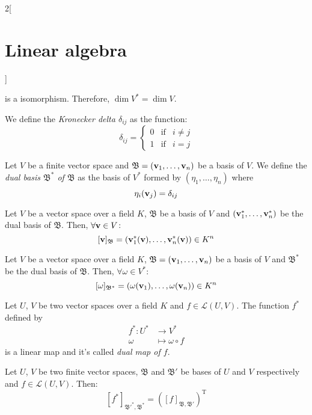 \documentclass[../../../main.tex]{subfiles}
\begin{document}
\begin{multicols}{2}[\section{Linear algebra}]
\begin{prop}
    is a isomorphism. Therefore, $\dim V^*=\dim V$.
  \end{prop}
  \begin{definition}
    We define the \textit{Kronecker delta $\delta_{ij}$} as the function: $$\delta_{ij}=\left\{
      \begin{array}{ccc}
        0 & \text{if} & i\ne j \\
        1 & \text{if} & i=j
      \end{array}
      \right.$$
  \end{definition}
  \begin{definition}
    Let $V$ be a finite vector space and $\mathfrak{B}=(\vb{v}_1,\ldots,\vb{v}_n)$ be a basis of $V$. We define the \textit{dual basis $\mathfrak{B}^*$ of $\mathfrak{B}$} as the basis of $V^*$ formed by $(\eta_1,\ldots,\eta_n)$ where $$\eta_i(\vb{v}_j)=\delta_{ij}$$
  \end{definition}
  \begin{lemma}
    Let $V$ be a vector space over a field $K$, $\mathfrak{B}$ be a basis of $V$ and $(\vb{v}_1^*,\ldots,\vb{v}_n^*)$ be the dual basis of $\mathfrak{B}$. Then, $\forall \vb{v}\in V$: $$[\vb{v}]_\mathfrak{B}=(\vb{v}_1^*(\vb{v}),\ldots,\vb{v}_n^*(\vb{v}))\in K^n$$
  \end{lemma}
  \begin{lemma}
    Let $V$ be a vector space over a field $K$, $\mathfrak{B}=(\vb{v}_1,\ldots,\vb{v}_n)$ be a basis of $V$ and $\mathfrak{B}^*$ be the dual basis of $\mathfrak{B}$. Then, $\forall \omega\in V^*$: $$[\omega]_{\mathfrak{B}^*}=(\omega(\vb{v}_1),\ldots,\omega(\vb{v}_n))\in K^n$$
  \end{lemma}
  \begin{definition}
    Let $U$, $V$ be two vector spaces over a field $K$ and $f\in \mathcal{L}(U,V)$. The function $f^*$ defined by
    \begin{align*}
      f^*:U^* & \longrightarrow V^*      \\
      \omega  & \longmapsto\omega\circ f
    \end{align*}
    is a linear map and it's called \textit{dual map of $f$}.
  \end{definition}
  \begin{theorem}
    Let $U$, $V$ be two finite vector spaces, $\mathfrak{B}$ and $\mathfrak{B}'$ be bases of $U$ and $V$ respectively and $f\in\mathcal{L}(U,V)$. Then: $$[f^*]_{\mathfrak{B}'^*,\mathfrak{B}^*}={([f]_{\mathfrak{B},\mathfrak{B}'})}^\mathrm{T}$$
  \end{theorem}

\end{multicols}
\end{document}
